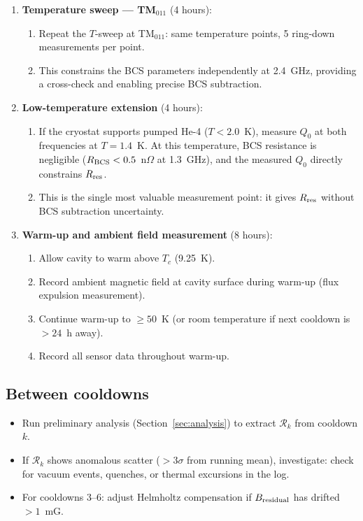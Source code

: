 \documentclass[11pt]{article}
\theoremstyle{definition}
\theoremstyle{remark}
\begin{document}
\begin{tcolorbox}[colback=white, colframe=black,
  title=\textbf{PHASE 0a: MEASUREMENT PROTOCOL (14 days, 6 cooldowns)},
  breakable]
\begin{enumerate}[label=\textbf{C\arabic*.}, leftmargin=2cm]
\item \textbf{Temperature sweep --- TM$_{011}$} (4 hours):
  \begin{enumerate}[nosep, label=(\alph*)]
  \item Repeat the $T$-sweep at TM$_{011}$: same temperature
    points, 5 ring-down measurements per point.
  \item This constrains the BCS parameters independently at
    2.4~GHz, providing a cross-check and enabling precise BCS
    subtraction.
  \end{enumerate}

\item \textbf{Low-temperature extension} (4 hours):
  \begin{enumerate}[nosep, label=(\alph*)]
  \item If the cryostat supports pumped He-4 ($T < 2.0$~K),
    measure $Q_0$ at both frequencies at $T = 1.4$~K. At this
    temperature, BCS resistance is negligible
    ($R_{\rm BCS} < 0.5$~n$\Omega$ at 1.3~GHz), and the measured
    $Q_0$ directly constrains $R_{\rm res}$.
  \item This is the single most valuable measurement point: it
    gives $R_{\rm res}$ without BCS subtraction uncertainty.
  \end{enumerate}

\item \textbf{Warm-up and ambient field measurement} (8 hours):
  \begin{enumerate}[nosep, label=(\alph*)]
  \item Allow cavity to warm above $T_c$ (9.25~K).
  \item Record ambient magnetic field at cavity surface during
    warm-up (flux expulsion measurement).
  \item Continue warm-up to $\geq 50$~K (or room temperature
    if next cooldown is $> 24$~h away).
  \item Record all sensor data throughout warm-up.
  \end{enumerate}

\end{enumerate}

\subsection*{Between cooldowns}

\begin{itemize}[nosep]
\item Run preliminary analysis (Section~\ref{sec:analysis}) to
  extract $\mathcal{R}_k$ from cooldown $k$.
\item If $\mathcal{R}_k$ shows anomalous scatter ($> 3\sigma$ from
  running mean), investigate: check for vacuum events, quenches,
  or thermal excursions in the log.
\item For cooldowns 3--6: adjust Helmholtz compensation if
  $B_{\rm residual}$ has drifted $> 1$~mG.
\end{itemize}

\end{tcolorbox}
\end{document}

